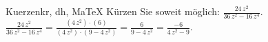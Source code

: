 \begin{MAufgabe}{Kuerzen}{kr, dh, MaTeX}
K\"urzen Sie soweit m\"oglich: $\frac{24\, z^2}{36\, z^2 - 16\, z^4}$.\\ 
\ifLsg\MLoesung
\quad $\frac{24\, z^2}{36\, z^2 - 16\, z^4}=\frac{(4\, z^2)\cdot(6)}{(4\, z^2)\cdot(9 - 4\, z^2)}=\frac{6}{9 - 4\, z^2}=\frac{-6}{4\, z^2 - 9}$.\else\relax\fi
 \end{MAufgabe}